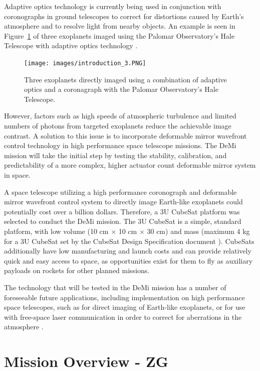 \documentclass[12pt]{article}
\begin{document}
Adaptive optics technology is currently being used in conjunction with coronographs in ground telescopes to correct for distortions caused by Earth's atmosphere and to resolve light from nearby objects.  An example is seen in Figure~\ref{fig:Intro_exo} of three exoplanets imaged using the Palomar Observatory's Hale Telescope with adaptive optics technology \cite{serabyn2010}.

\begin{figure}[!ht]
\centering
\texttt{[image: images/introduction\_3.PNG]}
\caption{Three exoplanets directly imaged using a combination of adaptive optics and a coronagraph with the Palomar Observatory's Hale Telescope.}
\label{fig:Intro_exo}
\end{figure}

However, factors such as high speeds of atmospheric turbulence and limited numbers of photons from targeted exoplanets reduce the achievable image contrast.  A solution to this issue is to incorporate deformable mirror wavefront control technology in high performance space telescope missions.  The DeMi mission will take the initial step by testing the stability, calibration, and predictability of a more complex, higher actuator count deformable mirror system in space.     

A space telescope utilizing a high performance coronograph and deformable mirror wavefront control system to directly image Earth-like exoplanets could potentially cost over a billion dollars.  Therefore, a 3U CubeSat platform was selected to conduct the DeMi mission.  The 3U CubeSat is a simple, standard platform, with low volume (10 cm $\times$ 10 cm $\times$ 30 cm) and mass (maximum 4 kg for a 3U CubeSat set by the CubeSat Design Specification document \cite{cubesat-specs}).   CubeSats additionally have low manufacturing and launch costs and can provide relatively quick and easy access to space, as opportunities exist for them to fly as auxiliary payloads on rockets for other planned missions. 

The technology that will be tested in the DeMi mission has a number of foreseeable future applications, including implementation on high performance space telescopes, such as for direct imaging of Earth-like exoplanets, or for use with free-space laser communication in order to correct for aberrations in the atmosphere \cite{cahoy-unpublished}.

\newpage
\section{Mission Overview - ZG}
\end{document}
